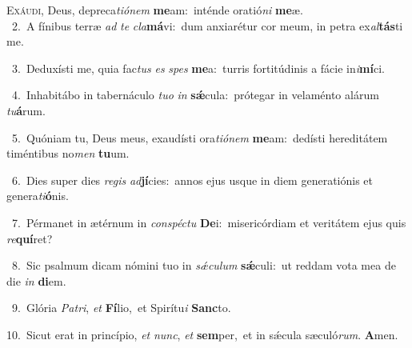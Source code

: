 \lettrine{\initial\textcolor{\initialcolor}{E}}{xáudi,} Deus, depreca\-\textit{ti}\-\textit{ó}\textit{nem} \textbf{me}\-am:~\star inténde oratió\textit{ni} \textbf{me}\-æ.\\
{\numbfont\textcolor{\numbcolor}{~2.}}~A fínibus terræ \textit{ad} \textit{te} \textit{cla}\-\textbf{má}vi:~\star dum anxiarétur cor meum, in petra ex\-\textit{al}\-\textbf{tás}ti me.\par
{\numbfont\textcolor{\numbcolor}{~3.}}~Deduxísti me, quia fac\textit{tus} \textit{es} \textit{spes} \textbf{me}\-a:~\star turris fortitúdinis a fácie in\-\textit{i}\-\textbf{mí}ci.\par
{\numbfont\textcolor{\numbcolor}{~4.}}~Inhabitábo in tabernáculo \textit{tu}\-\textit{o} \textit{in} \textbf{sǽ}\-cula:~\star prótegar in velaménto alárum \textit{tu}\-\textbf{á}rum.\par
{\numbfont\textcolor{\numbcolor}{~5.}}~Quóniam tu, Deus meus, exaudísti ora\-\textit{ti}\-\textit{ó}\textit{nem} \textbf{me}\-am:~\star dedísti hereditátem timéntibus no\textit{men} \textbf{tu}\-um.\par
{\numbfont\textcolor{\numbcolor}{~6.}}~Dies super dies \textit{re}\-\textit{gis} \textit{ad}\-\textbf{jí}cies:~\star annos ejus usque in diem generatiónis et genera\-\textit{ti}\-\textbf{ó}nis.\par
{\numbfont\textcolor{\numbcolor}{~7.}}~Pérmanet in ætérnum in \textit{con}\-\textit{spéc}\textit{tu} \textbf{De}\-i:~\star misericórdiam et veritátem ejus quis \textit{re}\-\textbf{quí}ret?\par
{\numbfont\textcolor{\numbcolor}{~8.}}~Sic psalmum dicam nómini tuo in \textit{sǽ}\-\textit{cu}\textit{lum} \textbf{sǽ}\-culi:~\star ut reddam vota mea de die \textit{in} \textbf{di}\-em.\par
{\numbfont\textcolor{\numbcolor}{~9.}}~Glória \textit{Pa}\-\textit{tri}, \textit{et} \textbf{Fí}\-lio,~\star et Spirítu\textit{i} \textbf{Sanc}\-to.\par
{\numbfont\textcolor{\numbcolor}{10.}}~Sicut erat in princípio, \textit{et} \textit{nunc}\-, \textit{et} \textbf{sem}\-per,~\star et in sǽcula sæculó\-\textit{rum}\-. \textbf{A}\-men.\par
